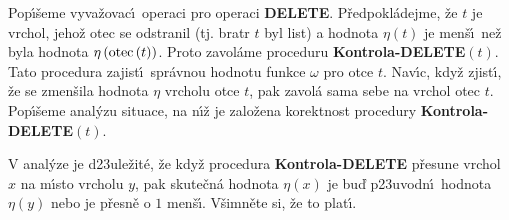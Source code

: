 \flushpar Pop\'\i\v seme vyva\v zovac\'\i\ operaci pro operaci 
{\bf DELETE}.  P\v red\-po\-kl\'adejme, \v ze $t$ je vrchol, jeho\v z otec se 
odstranil (tj.  bratr $t$ byl list) a hodnota $\eta \left(t\right)$ je men\v s\'\i\ 
ne\v z byla hodnota $\eta \left(\operatorname{otec}\left(t\right)\right)$.  Proto zavol\'ame proceduru 
{\bf Kontrola-DELETE$\left(t\right)$}.  Tato procedura zajist\'\i\ spr\'avnou 
hodnotu funkce $\omega$ pro otce $t$.  Nav\'\i c, kdy\v z zjist\'\i , \v ze se 
zmen\v sila hodnota $\eta$ vrcholu otce $t$, pak zavol\'a sama sebe 
na vrchol otec $t$. Pop\'\i\v seme anal\'yzu situace, na n\'\i\v z je 
zalo\v zena korektnost procedury {\bf Kontrola-DELETE$\left(t\right)$}.  
\medskip

\flushpar V anal\'yze je d\accent23ule\v zit\'e, \v ze kdy\v z procedura {\bf Kontrola-DELETE }
p\v resune vrchol $x$ na m\'\i sto vrcholu $y$, pak skute\v cn\'a hodnota $
\eta \left(x\right)$ 
je bu\v d p\accent23uvodn\'\i\ hodnota $\eta \left(y\right)$ nebo je p\v resn\v e o $
1$ men\v s\'\i . V\v simn\v ete si, \v ze to plat\'\i . 
\medskip

